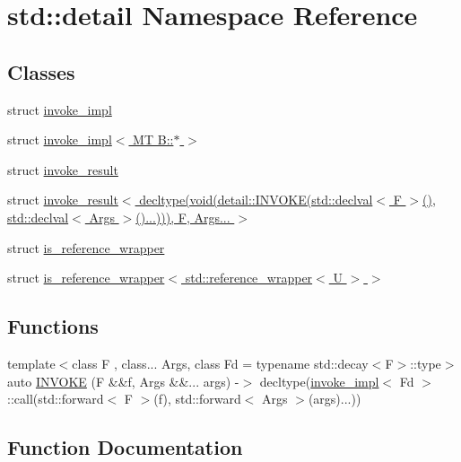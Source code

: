 \hypertarget{namespacestd_1_1detail}{}\section{std\+:\+:detail Namespace Reference}
\label{namespacestd_1_1detail}
\subsection*{Classes}
\begin{DoxyCompactItemize}
\item 
struct \hyperlink{structstd_1_1detail_1_1invoke__impl}{invoke\+\_\+impl}
\item 
struct \hyperlink{structstd_1_1detail_1_1invoke__impl_3_01MT_01B_1_1_5_01_4}{invoke\+\_\+impl$<$ M\+T B\+::$\ast$ $>$}
\item 
struct \hyperlink{structstd_1_1detail_1_1invoke__result}{invoke\+\_\+result}
\item 
struct \hyperlink{structstd_1_1detail_1_1invoke__result_3_01decltype_07void_07detail_1_1INVOKE_07std_1_1declval_3_86a9900dcd4a84f000244f479e0f71a8}{invoke\+\_\+result$<$ decltype(void(detail\+::\+I\+N\+V\+O\+K\+E(std\+::declval$<$ F $>$(), std\+::declval$<$ Args $>$()...))), F, Args... $>$}
\item 
struct \hyperlink{structstd_1_1detail_1_1is__reference__wrapper}{is\+\_\+reference\+\_\+wrapper}
\item 
struct \hyperlink{structstd_1_1detail_1_1is__reference__wrapper_3_01std_1_1reference__wrapper_3_01U_01_4_01_4}{is\+\_\+reference\+\_\+wrapper$<$ std\+::reference\+\_\+wrapper$<$ U $>$ $>$}
\end{DoxyCompactItemize}
\subsection*{Functions}
\begin{DoxyCompactItemize}
\item 
{\footnotesize template$<$class F , class... Args, class Fd  = typename std\+::decay$<$\+F$>$\+::type$>$ }\\auto \hyperlink{namespacestd_1_1detail_ac5263dda7d727dde5281b6b1da8ebb79}{I\+N\+V\+O\+KE} (F \&\&f, Args \&\&... args) -\/$>$ decltype(\hyperlink{structstd_1_1detail_1_1invoke__impl}{invoke\+\_\+impl}$<$ Fd $>$\+::call(std\+::forward$<$ F $>$(f), std\+::forward$<$ Args $>$(args)...))
\end{DoxyCompactItemize}


\subsection{Function Documentation}
\mbox{\label{namespacestd_1_1detail_ac5263dda7d727dde5281b6b1da8ebb79}} 
